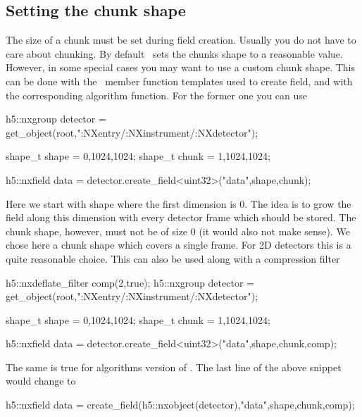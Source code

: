 \subsection{Setting the chunk shape}

The size of a chunk must be set during field creation. Usually you do not have
to care about chunking. By default \libpniio\ sets the chunks shape to a
reasonable value. However, in some special cases you may want to use a 
custom chunk shape. 
This can be done with the \nxgroup\ member function templates used to create
field, and with the corresponding algorithm function. 
For the former one you can use
\begin{cppcode}
h5::nxgroup detector = get_object(root,":NXentry/:NXinstrument/:NXdetector");

shape_t shape = {0,1024,1024};
shape_t chunk = {1,1024,1024};

h5::nxfield data = detector.create_field<uint32>("data",shape,chunk);
\end{cppcode}
Here we start with shape where the first dimension is $0$. The idea is to grow
the field along this dimension with every detector frame which should be stored. 
The chunk shape, however, must not be of size $0$ (it would also not make
sense). We chose here a chunk shape which covers a single frame. For 2D
detectors this is a quite reasonable choice. 
This can also be used along with a compression filter
\begin{cppcode}
h5::nxdeflate_filter comp(2,true);
h5::nxgroup detector = get_object(root,":NXentry/:NXinstrument/:NXdetector");

shape_t shape = {0,1024,1024};
shape_t chunk = {1,1024,1024};

h5::nxfield data = detector.create_field<uint32>("data",shape,chunk,comp);
\end{cppcode}
The same is true for algorithms version of . The last line of
the above snippet would change to
\begin{cppcode}
h5::nxfield data = create_field(h5::nxobject(detector),"data",shape,chunk,comp);
\end{cppcode}

